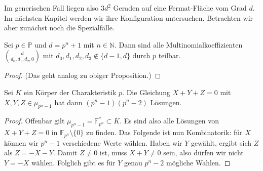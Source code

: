 Im generischen Fall liegen also $3d^2$ Geraden auf eine Fermat-Fläche vom Grad $d$. Im nächsten Kapitel werden wir ihre Konfiguration untersuchen. Betrachten wir aber zunächst noch die Spezialfälle.

\begin{prop}
Sei $p \in \mathbb P$ und $d = p^n+1$ mit $n \in \mathbb N$. Dann sind alle Multinomialkoeffizienten $\binom d{d_0,d_1,d_2,0}$ mit $d_0, d_1, d_2, d_3 \not\in \{d-1, d\}$ durch $p$ teilbar.
\end{prop}
\begin{proof}
(Das geht analog zu obiger Proposition.)
\end{proof}

\begin{lemma}
Sei $K$ ein Körper der Charakteristik $p$. Die Gleichung $X+Y+Z=0$ mit $X,Y,Z \in \mu_{p^n-1}$ hat dann $(p^n-1)(p^n-2)$ Lösungen.
\end{lemma}
\begin{proof}
Offenbar gilt $\mu_{p^n-1} = \mathbb F_{p^n}^* \subset K$. Es sind also alle Lösungen von $X+Y+Z=0$ in $\mathbb F_{p^n} \setminus \{0\}$ zu finden. Das Folgende ist nun Kombinatorik: für $X$ können wir $p^n-1$ verschiedene Werte wählen. Haben wir $Y$ gewählt, ergibt sich $Z$ als $Z=-X-Y$. Damit $Z \neq 0$ ist, muss $X+Y \neq 0$ sein, also dürfen wir nicht $Y = -X$ wählen. Folglich gibt es für $Y$ genau $p^n-2$ mögliche Wahlen.
\end{proof}

